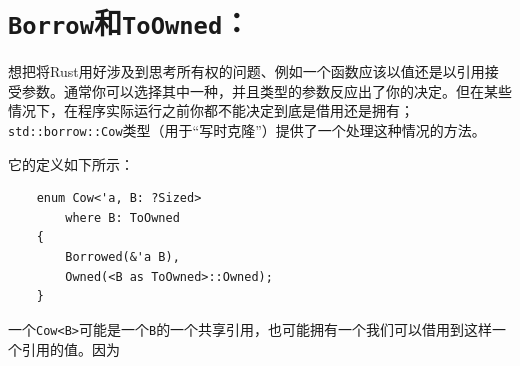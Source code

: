 \section{\texttt{Borrow}和\texttt{ToOwned}：}

想把将Rust用好涉及到思考所有权的问题、例如一个函数应该以值还是以引用接受参数。通常你可以选择其中一种，并且类型的参数反应出了你的决定。但在某些情况下，在程序实际运行之前你都不能决定到底是借用还是拥有；\texttt{std::borrow::Cow}类型（用于“写时克隆”）提供了一个处理这种情况的方法。

它的定义如下所示：
\begin{verbatim}
    enum Cow<'a, B: ?Sized>
        where B: ToOwned
    {
        Borrowed(&'a B),
        Owned(<B as ToOwned>::Owned);
    }
\end{verbatim}

一个\texttt{Cow<B>}可能是一个\texttt{B}的一个共享引用，也可能拥有一个我们可以借用到这样一个引用的值。因为\texttt{}
